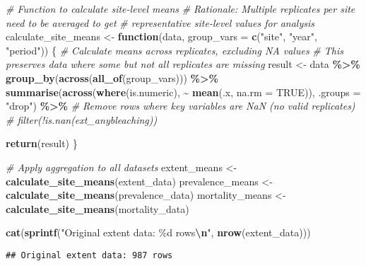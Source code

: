 \documentclass[
]{article}
\newenvironment{Shaded}{\begin{snugshade}}{\end{snugshade}}
\newcommand{\AttributeTok}[1]{\textcolor[rgb]{0.13,0.29,0.53}{#1}}
\newcommand{\CommentTok}[1]{\textcolor[rgb]{0.56,0.35,0.01}{\textit{#1}}}
\newcommand{\ConstantTok}[1]{\textcolor[rgb]{0.56,0.35,0.01}{#1}}
\newcommand{\ControlFlowTok}[1]{\textcolor[rgb]{0.13,0.29,0.53}{\textbf{#1}}}
\newcommand{\FunctionTok}[1]{\textcolor[rgb]{0.13,0.29,0.53}{\textbf{#1}}}
\newcommand{\NormalTok}[1]{#1}
\newcommand{\OtherTok}[1]{\textcolor[rgb]{0.56,0.35,0.01}{#1}}
\newcommand{\SpecialCharTok}[1]{\textcolor[rgb]{0.81,0.36,0.00}{\textbf{#1}}}
\newcommand{\StringTok}[1]{\textcolor[rgb]{0.31,0.60,0.02}{#1}}
\begin{document}
\begin{Shaded}
\begin{Highlighting}[]
\CommentTok{\# Function to calculate site{-}level means}
\CommentTok{\# Rationale: Multiple replicates per site need to be averaged to get }
\CommentTok{\# representative site{-}level values for analysis}
\NormalTok{calculate\_site\_means }\OtherTok{\textless{}{-}} \ControlFlowTok{function}\NormalTok{(data, }\AttributeTok{group\_vars =} \FunctionTok{c}\NormalTok{(}\StringTok{"site"}\NormalTok{, }\StringTok{"year"}\NormalTok{, }\StringTok{"period"}\NormalTok{)) \{}
  \CommentTok{\# Calculate means across replicates, excluding NA values}
  \CommentTok{\# This preserves data where some but not all replicates are missing}
\NormalTok{  result }\OtherTok{\textless{}{-}}\NormalTok{ data }\SpecialCharTok{\%\textgreater{}\%}
    \FunctionTok{group\_by}\NormalTok{(}\FunctionTok{across}\NormalTok{(}\FunctionTok{all\_of}\NormalTok{(group\_vars))) }\SpecialCharTok{\%\textgreater{}\%}
    \FunctionTok{summarise}\NormalTok{(}\FunctionTok{across}\NormalTok{(}\FunctionTok{where}\NormalTok{(is.numeric), }\SpecialCharTok{\textasciitilde{}} \FunctionTok{mean}\NormalTok{(.x, }\AttributeTok{na.rm =} \ConstantTok{TRUE}\NormalTok{)), }\AttributeTok{.groups =} \StringTok{"drop"}\NormalTok{) }\SpecialCharTok{\%\textgreater{}\%}
    \CommentTok{\# Remove rows where key variables are NaN (no valid replicates)}
    \CommentTok{\# filter(!is.nan(ext\_anybleaching))}
  
  \FunctionTok{return}\NormalTok{(result)}
\NormalTok{\}}

\CommentTok{\# Apply aggregation to all datasets}
\NormalTok{extent\_means }\OtherTok{\textless{}{-}} \FunctionTok{calculate\_site\_means}\NormalTok{(extent\_data)}
\NormalTok{prevalence\_means }\OtherTok{\textless{}{-}} \FunctionTok{calculate\_site\_means}\NormalTok{(prevalence\_data)  }
\NormalTok{mortality\_means }\OtherTok{\textless{}{-}} \FunctionTok{calculate\_site\_means}\NormalTok{(mortality\_data)}

\FunctionTok{cat}\NormalTok{(}\FunctionTok{sprintf}\NormalTok{(}\StringTok{"Original extent data: \%d rows}\SpecialCharTok{\textbackslash{}n}\StringTok{"}\NormalTok{, }\FunctionTok{nrow}\NormalTok{(extent\_data)))}
\end{Highlighting}
\end{Shaded}

\begin{verbatim}
## Original extent data: 987 rows
\end{verbatim}
\end{document}
